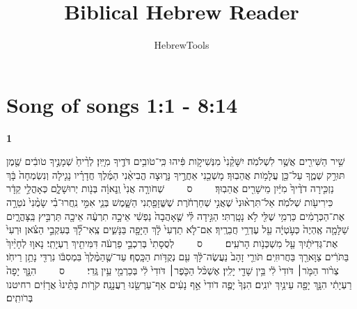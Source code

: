 \documentclass[a4paper]{article}
\title{Biblical Hebrew Reader}
\author{HebrewTools}
\newif\iflargetext
\newif\iflargertext
\newcommand{\rdrchap}[1]{\begin{english}\setRL\small\textbf{#1}\end{english}}
\newcommand{\rdrverse}[1]{\raisebox{2.5pt}{\smaller[4]#1}}
\newcommand{\setuma}{~~~~{\scriptsize ס}~~~~}
\begin{document}
\def\thepassage{Song of songs 1:1 - 8:14}

\section*{\thepassage}
\setstretch{\iflargetext\iflargertext 2.1\else 1.7\fi\else 1.3\fi}
\iflargetext\iflargertext\LARGE\else\Large\fi\fi
\begin{hebrew}
\RTLmulticolcolumns
\iflargetext\else\begin{multicols}{2}\fi


\rdrchap{1}\rdrverse{1} שִׁ֥יר הַשִּׁירִ֖ים אֲשֶׁ֥ר לִשְׁלֹמֹֽה׃ 
\rdrverse{2} יִשָּׁקֵ֨נִי֙ מִנְּשִׁיקֹ֣ות פִּ֔יהוּ כִּֽי־טֹובִ֥ים דֹּדֶ֖יךָ מִיָּֽיִן׃ 
\rdrverse{3} לְרֵ֨יחַ֙ שְׁמָנֶ֣יךָ טֹובִ֔ים שֶׁ֖מֶן תּוּרַ֣ק שְׁמֶ֑ךָ עַל־כֵּ֖ן עֲלָמֹ֥ות אֲהֵבֽוּךָ׃ 
\rdrverse{4} מָשְׁכֵ֖נִי אַחֲרֶ֣יךָ נָּר֑וּצָה הֱבִיאַ֨נִי הַמֶּ֜לֶךְ חֲדָרָ֗יו נָגִ֤ילָה וְנִשְׂמְחָה֙ בָּ֔ךְ נַזְכִּ֤ירָה דֹדֶ֨יךָ֙ מִיַּ֔יִן מֵישָׁרִ֖ים אֲהֵבֽוּךָ׃ \setuma{} 
\rdrverse{5} שְׁחֹורָ֤ה אֲנִי֙ וְֽנָאוָ֔ה בְּנֹ֖ות יְרוּשָׁלִָ֑ם כְּאָהֳלֵ֣י קֵדָ֔ר כִּירִיעֹ֖ות שְׁלֹמֹֽה׃ 
\rdrverse{6} אַל־תִּרְא֨וּנִי֙ שֶׁאֲנִ֣י שְׁחַרְחֹ֔רֶת שֶׁשֱּׁזָפַ֖תְנִי הַשָּׁ֑מֶשׁ בְּנֵ֧י אִמִּ֣י נִֽחֲרוּ־בִ֗י שָׂמֻ֨נִי֙ נֹטֵרָ֣ה אֶת־הַכְּרָמִ֔ים כַּרְמִ֥י שֶׁלִּ֖י לֹ֥א נָטָֽרְתִּי׃ 
\rdrverse{7} הַגִּ֣ידָה לִּ֗י שֶׁ֤אָהֲבָה֙ נַפְשִׁ֔י אֵיכָ֣ה תִרְעֶ֔ה אֵיכָ֖ה תַּרְבִּ֣יץ בַּֽצָּהֳרָ֑יִם שַׁלָּמָ֤ה אֶֽהְיֶה֙ כְּעֹ֣טְיָ֔ה עַ֖ל עֶדְרֵ֥י חֲבֵרֶֽיךָ׃ 
\rdrverse{8} אִם־לֹ֤א תֵדְעִי֙ לָ֔ךְ הַיָּפָ֖ה בַּנָּשִׁ֑ים צְֽאִי־לָ֞ךְ בְּעִקְבֵ֣י הַצֹּ֗אן וּרְעִי֙ אֶת־גְּדִיֹּתַ֔יִךְ עַ֖ל מִשְׁכְּנֹ֥ות הָרֹעִֽים׃ \setuma{} 
\rdrverse{9} לְסֻסָתִי֙ בְּרִכְבֵ֣י פַרְעֹ֔ה דִּמִּיתִ֖יךְ רַעְיָתִֽי׃ 
\rdrverse{10} נָאו֤וּ לְחָיַ֨יִךְ֙ בַּתֹּרִ֔ים צַוָּארֵ֖ךְ בַּחֲרוּזִֽים׃ 
\rdrverse{11} תֹּורֵ֤י זָהָב֙ נַעֲשֶׂה־לָּ֔ךְ עִ֖ם נְקֻדֹּ֥ות הַכָּֽסֶף׃ 
\rdrverse{12} עַד־שֶׁ֤הַמֶּ֨לֶךְ֙ בִּמְסִבֹּ֔ו נִרְדִּ֖י נָתַ֥ן רֵיחֹֽו׃ 
\rdrverse{13} צְרֹ֨ור הַמֹּ֤ר׀ דֹּודִי֙ לִ֔י בֵּ֥ין שָׁדַ֖י יָלִֽין׃ 
\rdrverse{14} אֶשְׁכֹּ֨ל הַכֹּ֤פֶר׀ דֹּודִי֙ לִ֔י בְּכַרְמֵ֖י עֵ֥ין גֶּֽדִי׃ \setuma{} 
\rdrverse{15} הִנָּ֤ךְ יָפָה֙ רַעְיָתִ֔י הִנָּ֥ךְ יָפָ֖ה עֵינַ֥יִךְ יֹונִֽים׃ 
\rdrverse{16} הִנְּךָ֙ יָפֶ֤ה דֹודִי֙ אַ֣ף נָעִ֔ים אַף־עַרְשֵׂ֖נוּ רַעֲנָנָֽה׃ 
\rdrverse{17} קֹרֹ֤ות בָּתֵּ֨ינוּ֙ אֲרָזִ֔ים רחיטנו בְּרֹותִֽים׃ 



\end{multicols}
\end{hebrew}
\end{document}
